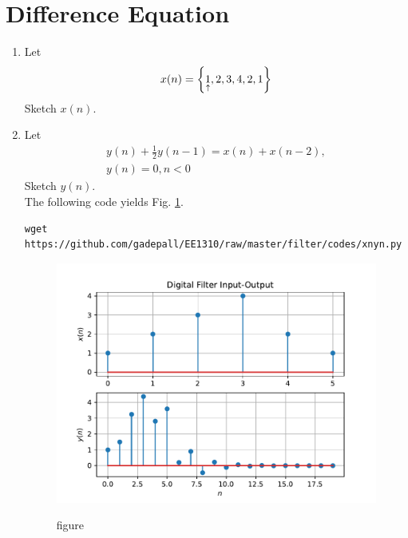 \documentclass[journal,12pt,twocolumn]{IEEEtran}
\renewcommand\thesection{\arabic{section}}
\begin{document}
\section{Difference Equation}
\begin{enumerate}[label=\thesection.\arabic*,ref=\thesection.\theenumi]
\item Let
\begin{equation}
x(n) = \left\{\underset{\uparrow}{1},2,3,4,2,1\right\}
\end{equation}
Sketch $x(n)$.
\item Let
\begin{multline}
\label{eq:iir_filter}
y(n) + \frac{1}{2}y(n-1) = x(n) + x(n-2), 
\\
 y(n) = 0, n < 0
\end{multline}
Sketch $y(n)$.
\\
\solution The following code yields Fig. \ref{fig:xnyn}.
\begin{lstlisting}
wget https://github.com/gadepall/EE1310/raw/master/filter/codes/xnyn.py
\end{lstlisting}
\begin{figure}[!ht]
\begin{center}
\includegraphics[width=\columnwidth]{./figs/xnyn}
\end{center}
\caption{figure}{}
\label{fig:xnyn}	
\end{figure}
\end{enumerate}
\end{document}
